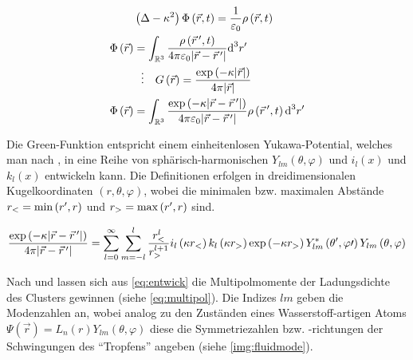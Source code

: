           \begin{align}
            &\left(\Delta-\kappa^2\right)\Phi\left(\vec{r},t\right)=\frac{1}{\varepsilon_\text{0}}\rho\left(\vec{r},t\right) \label{eq:poisson} \\
            \Phi\left(\vec{r}\right)&=\int_{\mathbb{R}^3}\frac{\rho\left(\vec{r}\,^\prime,t\right)}{4\pi\varepsilon_\text{0}|\vec{r}-\vec{r}\,^\prime|}\textnormal{d}^{3}r^\prime \\
            &\,\,\,\,\vdots\quad G\left(\vec{r}\right)=\frac{\exp\left(-\kappa|\vec{r}|\right)}{4\pi|\vec{r}|} \label{eq:green}\\
            \Phi\left(\vec{r}\right)&=\int_{\mathbb{R}^3}\frac{\exp\left(-\kappa|\vec{r}-\vec{r}\,^\prime|\right)}{4\pi\varepsilon_\text{0}|\vec{r}-\vec{r}\,^\prime|}\rho\left(\vec{r}\,^\prime,t\right)\textnormal{d}^{3}r^\prime \label{eq:fluid}
          \end{align}

        Die Green-Funktion entspricht einem einheitenlosen Yukawa-Potential, welches man nach \cite{Arfken05},\cite{Yap10} in eine Reihe von sphärisch-harmonischen  $Y_{lm}\left(\theta,\varphi\right)$ und  $i_{l}\left(x\right)$ und $k_{l}\left(x\right)$ entwickeln kann. Die Definitionen erfolgen in dreidimensionalen Kugelkoordinaten $\left(r,\theta,\varphi\right)$, wobei die minimalen bzw. maximalen Abstände $r_\text{<}=\min\left(r^\prime,r\right)$ und $r_\text{>}=\max\left(r^\prime,r\right)$ sind.

          \begin{align}
            \frac{\exp\left(-\kappa|\vec{r}-\vec{r}\,^\prime|\right)}{4\pi|\vec{r}-\vec{r}\,^\prime|}=\sum_{l=0}^{\infty}\sum_{m=-l}^{l}\frac{r_\text{<}^l}{r_\text{>}^{l+1}}i_{l}\left(\kappa r_\text{<}\right)k_{l}\left(\kappa r_\text{>}\right)\exp\left(-\kappa r_\text{>}\right)Y_{lm}^*\left(\theta^\prime,\varphi\prime\right)Y_{lm}\left(\theta,\varphi\right) \label{eq:entwick}
          \end{align}

        Nach \cite{Ivanov09} und \cite{Schella13} lassen sich aus \autoref{eq:entwick} die Multipolmomente der Ladungsdichte des Clusters gewinnen (siehe \autoref{eq:multipol}). Die Indizes $lm$ geben die Modenzahlen an, wobei analog zu den Zust\"anden eines Wasserstoff-artigen Atoms $\Psi\left(\vec{r}\right)=L_{n}\left(r\right)Y_{lm}\left(\theta,\varphi\right)$ diese die Symmetriezahlen bzw. -richtungen der Schwingungen des "`Tropfens"' angeben (siehe \autoref{img:fluidmode}).


